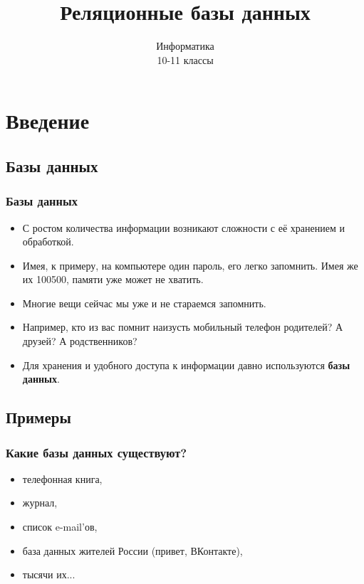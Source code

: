\documentclass[compress,red]{beamer}
\title{Реляционные базы данных}
\author{Информатика \\ 10-11 классы}
\begin{document}
\maketitle

\section{Введение}

\subsection{Базы данных}
\begin{frame}[fragile]
  \frametitle{Базы данных}
  \begin{itemize}
    \item С ростом количества информации возникают сложности с её хранением и обработкой.
    \item Имея, к примеру, на компьютере один пароль, его легко запомнить. Имея же их 100500, памяти уже может не хватить.
    \item Многие вещи сейчас мы уже и не стараемся запомнить.
    \item Например, кто из вас помнит наизусть мобильный телефон родителей? А друзей? А родственников?
    \item Для хранения и удобного доступа к информации давно используются \textbf{базы данных}.
  \end{itemize}
\end{frame}

\subsection{Примеры}
\begin{frame}[fragile]
  \frametitle{Какие базы данных существуют?}
  \begin{itemize}[<+->]
    \item телефонная книга,
    \item журнал,
    \item список e-mail'ов,
    \item база данных жителей России (привет, ВКонтакте),
    \item тысячи их...
  \end{itemize}
\end{frame}
\end{document}
